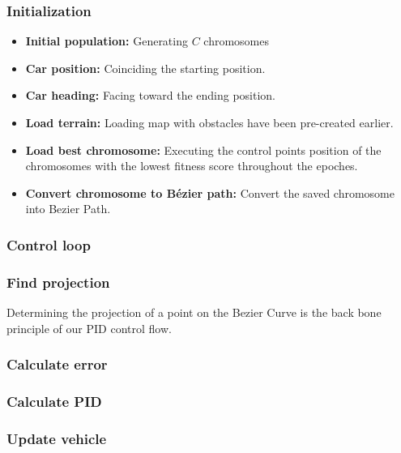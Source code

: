     \subsubsection{Initialization}
    \begin{itemize}
      \item \textbf{Initial population:} Generating $C$ chromosomes 
      \item \textbf{Car position:} Coinciding the starting position.
      \item \textbf{Car heading:} Facing toward the ending position.
      \item \textbf{Load terrain:} Loading map with obstacles have been pre-created earlier.
      \item \textbf{Load best chromosome:} Executing the control points position of the chromosomes with the lowest fitness score throughout the epoches.
      \item \textbf{Convert chromosome to Bézier path:} Convert the saved chromosome into Bezier Path.
    \end{itemize}
    \subsubsection{Control loop}
    \subsubsection*{Find projection}
    Determining the projection of a point on the Bezier Curve is the back bone principle of our PID control flow.

    \subsubsection*{Calculate error}
    \subsubsection*{Calculate PID}

    \subsubsection*{Update vehicle}
